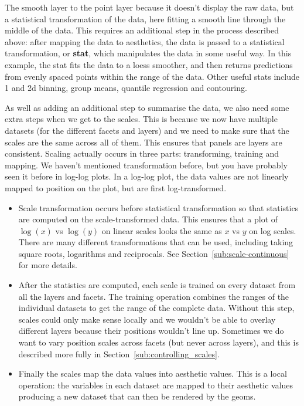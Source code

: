 The smooth layer to the point layer because it doesn't display the raw data, but a statistical transformation of the data, here fitting a smooth line through the middle of the data. This requires an additional step in the process described above: after mapping the data to aesthetics, the data is passed to a statistical transformation, or \textbf{stat}, which manipulates the data in some useful way. In this example, the stat fits the data to a loess smoother, and then returns predictions from evenly spaced points within the range of the data. Other useful stats include 1 and 2d binning, group means, quantile regression and contouring.

As well as adding an additional step to summarise the data, we also need some extra steps when we get to the scales. This is because we now have multiple datasets (for the different facets and layers) and we need to make sure that the scales are the same across all of them. This ensures that panels are layers are consistent. Scaling actually occurs in three parts: transforming, training and mapping. We haven't mentioned transformation before, but you have probably seen it before in log-log plots. In a log-log plot, the data values are not linearly mapped to position on the plot, but are first log-transformed.

\begin{itemize}
  \item Scale transformation occurs before statistical transformation so that statistics are computed on the scale-transformed data.  This ensures that a plot of $\log(x)$ vs $\log(y)$ on linear scales looks the same as $x$ vs $y$ on log scales. There are many different transformations that can be used, including taking square roots, logarithms and reciprocals. See Section~\ref{sub:scale-continuous} for more details. 
  
  \item After the statistics are computed, each scale is trained on every dataset from all the layers and facets.  The training operation combines the ranges of the individual datasets to get the range of the complete data.  Without this step, scales could only make sense locally and we wouldn't be able to overlay different layers because their positions wouldn't line up.  Sometimes we do want to vary position scales across facets (but never across layers), and this is described more fully in Section~\ref{sub:controlling_scales}.
  
  \item Finally the scales map the data values into aesthetic values.  This is a local operation: the variables in each dataset are mapped to their aesthetic values producing a new dataset that can then be rendered by the geoms.
  
\end{itemize}

